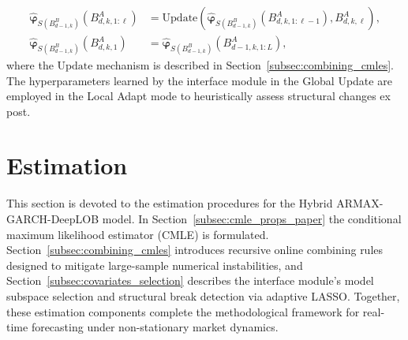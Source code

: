 \documentclass[10pt,a4paper,oneside]{article}
\begin{document}
\begin{align*}
    \hat{\boldsymbol{\varphi}}_{S(B^B_{d-1,k})}\left(B^A_{d,k,1:\ell} \right) &= \mathrm{Update}\left(\hat{\boldsymbol{\varphi}}_{S(B^B_{d-1,k})}\left(B^A_{d,k,1:\ell-1} \right), B^A_{d,k,\ell}\right),\\
    \hat{\boldsymbol{\varphi}}_{S(B^B_{d-1,k})}\left(B^A_{d,k,1} \right) &= \hat{\boldsymbol{\varphi}}_{S(B^B_{d-1,k})}\left(B^A_{d - 1,k,1:L} \right),
\end{align*}
where the $\mathrm{Update}$ mechanism is described in Section~\ref{subsec:combining_cmles}. The hyperparameters learned by the interface module in the Global Update are employed in the Local Adapt mode to heuristically assess structural changes ex post.



\section{Estimation}
\label{Sect:Estimation}
This section is devoted to the estimation procedures for the Hybrid ARMAX-GARCH-DeepLOB model.  In Section~\ref{subsec:cmle_props_paper} the conditional maximum likelihood estimator (CMLE) is formulated.  Section~\ref{subsec:combining_cmles} introduces recursive online combining rules designed to mitigate large-sample numerical instabilities, and Section~\ref{subsec:covariates_selection} describes the interface module’s model subspace selection and structural break detection via adaptive LASSO.  Together, these estimation components complete the methodological framework for real-time forecasting under non-stationary market dynamics.
\end{document}
